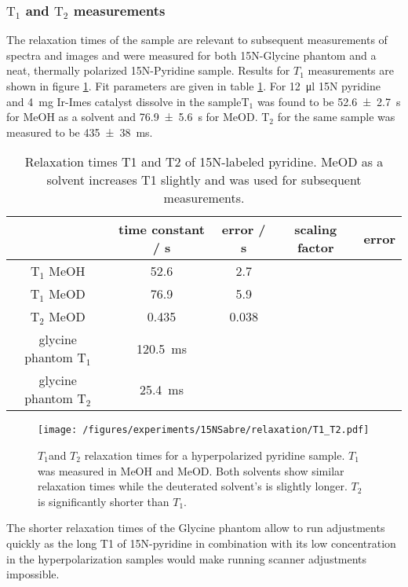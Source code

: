     \subsubsection{$\mathrm{T_1}$ and $\mathrm{T_2}$ measurements}
    The relaxation times of the sample are relevant to subsequent measurements of spectra and images and were measured for both 15N-Glycine phantom and a neat, thermally polarized 15N-Pyridine sample.
    Results for $T_1$ measurements are shown in figure \ref{fig:results:T1T2}. Fit parameters are given in table \ref{table:results:T1T2}. For \SI{12}{\micro\litre} 15N pyridine and \SI{4}{\milli\gram} Ir-Imes catalyst dissolve in the sample$\mathrm{T}_1$ was found to be \SI{52.6\pm 2.7}{\second} for MeOH as a solvent and \SI{76.9\pm 5.6}{\second} for MeOD. $\mathrm{T}_2$ for the same sample was measured to be \SI{435\pm 38}{\milli\second}.
        \begin{table}
            \begin{tabular}{|c|c|c|c|c|}
                \hline
                    & time constant / s & error / s & scaling factor & error\\
                    \hline
                $\mathrm{T_1}$ MeOH & 52.6 & 2.7 & & \\
                $\mathrm{T_1}$ MeOD & 76.9 & 5.9 & & \\
                $\mathrm{T_2}$ MeOD &  0.435 & 0.038 & &\\
                glycine phantom $\mathrm{T_1}$& \SI{120.5}{\milli\second}& &  & \\
                glycine phantom $\mathrm{T_2}$&\SI{25.4}{\milli\second} & & &  \\
                \hline
            \end{tabular}
            \caption[Relaxation times]{Relaxation times T1 and T2 of 15N-labeled pyridine. MeOD as a solvent increases T1 slightly and was used for subsequent measurements.}
            \label{table:results:T1T2}
        \end{table}
        \begin{figure}
            \texttt{[image: /figures/experiments/15NSabre/relaxation/T1\_T2.pdf]}
            \caption[T1/T2 of 15N]{$T_1$and $T_2$ relaxation times for a hyperpolarized pyridine sample. $T_1$ was measured in MeOH and MeOD. Both solvents show similar relaxation times while the deuterated solvent's is slightly longer. $T_2$ is significantly shorter than $T_1$.}
            \label{fig:results:T1T2}
        \end{figure}
        The shorter relaxation times of the Glycine phantom allow to run adjustments quickly as the long T1 of 15N-pyridine in combination with its low concentration in the hyperpolarization samples would make running scanner adjustments impossible.
